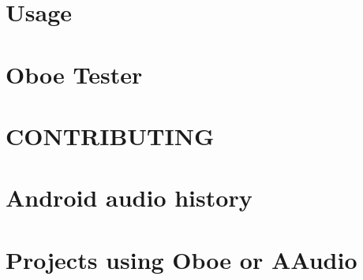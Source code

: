 \let\mypdfximage\pdfximage\def\pdfximage{\immediate\mypdfximage}\documentclass[twoside]{book}
\newcommand{\+}{\discretionary{\mbox{\scriptsize$\hookleftarrow$}}{}{}}
\begin{document}
\chapter{Usage}
\label{md__c_1__users_fab_src__github_branches__neural_amp_modeler_plugin_i_plug2__dependencies__build_88974f9e386a98c1118f20861dbc068c}

\chapter{Oboe Tester}
\label{md__c_1__users_fab_src__github_branches__neural_amp_modeler_plugin_i_plug2__dependencies__build_a547c5eb8b032487dcd34e1a9d88f2f5}

\chapter{C\+O\+N\+T\+R\+I\+B\+U\+T\+I\+NG}
\label{md__c_1__users_fab_src__github_branches__neural_amp_modeler_plugin_i_plug2__dependencies__build_b441a4b9afe74482f76db3b8852d8f89}

\chapter{Android audio history}
\label{md__c_1__users_fab_src__github_branches__neural_amp_modeler_plugin_i_plug2__dependencies__build_6da6e7ef3d49e4110af5e0792eae1d35}

\chapter{Projects using Oboe or A\+Audio}
\label{md__c_1__users_fab_src__github_branches__neural_amp_modeler_plugin_i_plug2__dependencies__build_7f605ee3a07d157089fb0fcab80fd047}

\end{document}
